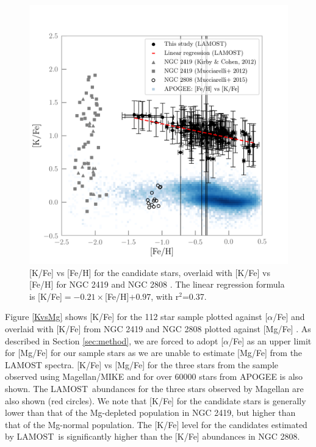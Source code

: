 \documentclass[a4paper,fleqn,usenatbib]{mnras}
\newcommand{\project}[1]{#1}
\newcommand{\lamost}{\project{LAMOST}}
\begin{document}
\begin{figure}
	\includegraphics[width=\columnwidth]{KvsFe.png}
    \caption{[K/Fe] vs [Fe/H] for the candidate stars, overlaid with [K/Fe] vs [Fe/H] for NGC 2419 and NGC 2808 \citep{cohenkirby2012, mucciarelli2012, mucciarelli2015}. The linear regression formula is \textrm{[K/Fe]$=-0.21 \times$[Fe/H]$+0.97$, with r$^2$=0.37}.}
    \label{KvsFe}
\end{figure}

Figure \ref{KvsMg} shows [K/Fe]  for the 112 star sample plotted against $[\alpha$/Fe] and overlaid with [K/Fe] from NGC 2419 and NGC 2808 plotted against [Mg/Fe] \citep{cohenkirby2012, mucciarelli2012, mucciarelli2015}. As described in Section \ref{sec:method}, we are forced to adopt [$\alpha$/Fe] as an upper limit for [Mg/Fe] for our sample stars as we are unable to estimate [Mg/Fe] from the LAMOST spectra. [K/Fe] vs [Mg/Fe] for the three stars from the sample observed using Magellan/MIKE and for over 60000 stars from APOGEE \citep{alam2015} is also shown. The \lamost\ abundances for the three stars observed by Magellan are also shown (red circles). We note that [K/Fe] for the candidate stars is generally lower than that of the Mg-depleted population in NGC 2419, but higher than that of the Mg-normal population. The [K/Fe] level for the candidates estimated by \lamost\ is significantly higher than the [K/Fe] abundances in NGC 2808.
\end{document}
